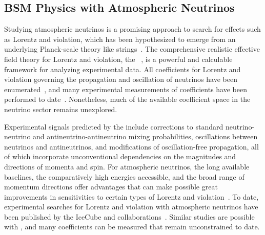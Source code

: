 \subsection{BSM Physics with Atmospheric Neutrinos}
\label{sec:nonaccel-atm-bsm}

Studying  atmospheric neutrinos is a promising approach
to search for  effects such as Lorentz and  violation,
which has been hypothesized
to emerge from an underlying Planck-scale theory like strings~\cite{Kostelecky:1988zi,Kostelecky:1991ak}.
The comprehensive realistic effective field theory
for Lorentz and  violation,
the ~\cite{Kostelecky:1994rn,Colladay:1996iz,Colladay:1998fq,Kostelecky:2003fs},
is a powerful and calculable framework
for analyzing experimental data.
All  coefficients for Lorentz and  violation
governing the propagation and oscillation of neutrinos
have been enumerated~\cite{Kostelecky:2003cr,Kostelecky:2011gq},
and many experimental measurements of  coefficients 
have been performed to date~\cite{Kostelecky:2008ts}.
Nonetheless,
much of the available  coefficient space 
in the neutrino sector remains unexplored.

Experimental signals predicted by the  include
corrections to standard neutrino-neutrino 
and antineutrino-antineutrino mixing probabilities,
oscillations between neutrinos and antineutrinos,
and modifications of oscillation-free propagation,
all of which incorporate unconventional dependencies
on the magnitudes and directions of momenta and spin.
For  atmospheric neutrinos,
the long available baselines,
the comparatively high energies accessible,
and the broad range of momentum directions
offer advantages that can make possible great
improvements 
in sensitivities to certain types of Lorentz and  violation~\cite{Kostelecky:2003cr,Kostelecky:2011gq,Kostelecky:2003xn,Kostelecky:2004hg,Diaz:2009qk,Diaz:2013saa,Diaz:2013wia}.
To date,
experimental searches for Lorentz and  violation
with atmospheric neutrinos have been published 
by the IceCube and \superk collaborations~\cite{Abbasi:2010kx,Abe:2014wla,Aartsen:2017ibm}.
Similar studies are possible with ,
and many  coefficients can be measured that remain unconstrained to date.

